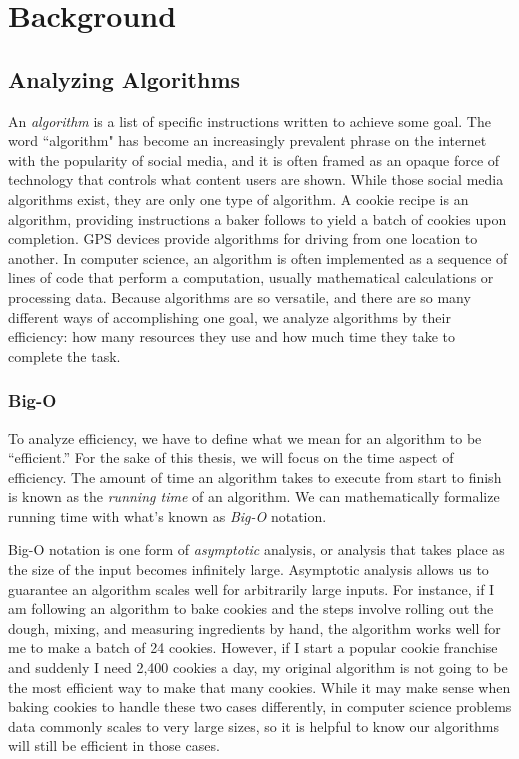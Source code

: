 \chapter{Background}

\section{Analyzing Algorithms}

An \textit{algorithm} is a list of specific instructions written to achieve some
goal. The word ``algorithm" has become an increasingly prevalent phrase on the
internet with the popularity of social media, and it is often framed as an
opaque force of technology that controls what content users are shown.
While those social media algorithms exist, they are only one type of
algorithm. A cookie recipe is an algorithm, providing instructions a baker
follows to yield a batch of cookies upon completion. GPS devices provide
algorithms for driving from one location to another. In computer science, an
algorithm is often implemented as a sequence of lines of code that perform a computation, usually
mathematical calculations or processing data. Because algorithms are so
versatile, and there are so many different ways of accomplishing one goal, we
analyze algorithms by their efficiency: how many resources they use and how much
time they take to complete the task.

\subsection{Big-O}

To analyze efficiency, we have to define what we mean for an algorithm to be
“efficient.” For the sake of this thesis, we will focus on the time aspect of
efficiency. The amount of time an algorithm takes to execute from start to
finish is known as the \textit{running time} of an algorithm. We can
mathematically formalize running time with what’s known as \textit{Big-O}
notation.

Big-O notation is one form of \textit{asymptotic} analysis, or analysis that takes
place as the size of the input becomes infinitely large. Asymptotic analysis allows us
to guarantee an algorithm scales well for arbitrarily large inputs. 
For instance, if I am following an
algorithm to bake cookies and the steps involve rolling out the dough, mixing,
and measuring ingredients by hand, the algorithm works well for me to make a
batch of 24 cookies. However, if I start a popular cookie franchise and suddenly
I need 2,400 cookies a day, my original algorithm is not going to be the most
efficient way to make that many cookies. While it may make sense when baking
cookies to handle these two cases differently, in computer science problems
data commonly scales to very large sizes, so it is helpful to know our
algorithms will still be efficient in those cases.

